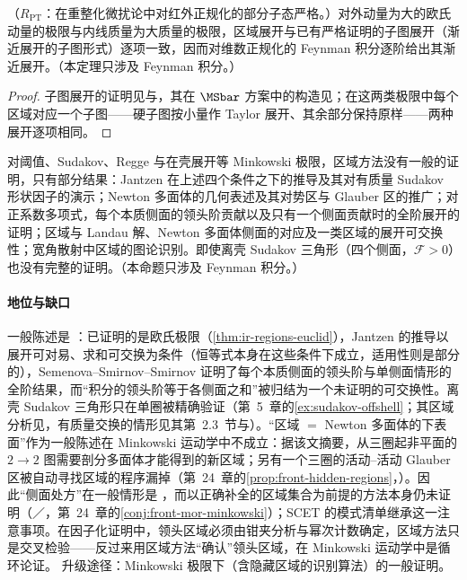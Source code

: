\begin{theorem}\label{thm:ir-regions-euclid}
（$R_{\mathrm{PT}}$：在重整化微扰论中对红外正规化的部分子态严格。）对外动量为大的欧氏动量的极限与内线质量为大质量的极限，区域展开与已有严格证明的子图展开（渐近展开的子图形式）逐项一致，因而对维数正规化的 Feynman 积分逐阶给出其渐近展开。（本定理只涉及 Feynman 积分。）
\end{theorem}
\begin{proof}
子图展开的证明见\cite{Smirnov:1990rz}与\cite{Smirnov2002}，其在 $\MSbar$ 方案中的构造见\cite{Gorishnii1989}；在这两类极限中每个区域对应一个子图——硬子图按小量作 Taylor 展开、其余部分保持原样——两种展开逐项相同\cite{Smirnov2002}。
\end{proof}

\begin{proposition}\label{prop:ir-regions-minkowski}
对阈值、Sudakov、Regge 与在壳展开等 Minkowski 极限，区域方法没有一般的证明，只有部分结果：Jantzen 在上述四个条件之下的推导及其对有质量 Sudakov 形状因子的演示\cite{Jantzen2011}；Newton 多面体的几何表述\cite{Pak:2010pt}及其对势区与 Glauber 区的推广\cite{Jantzen:2012mw}；对正系数多项式，每个本质侧面的领头阶贡献以及只有一个侧面贡献时的全阶展开的证明\cite{Semenova:2018cwy}；区域与 Landau 解、Newton 多面体侧面的对应及一类区域的展开可交换性\cite{Gardi:2022khw}；宽角散射中区域的图论识别\cite{Ma:2023hrt}。即使离壳 Sudakov 三角形（四个侧面，$\mathcal F>0$）也没有完整的证明。（本命题只涉及 Feynman 积分。）
\end{proposition}

\paragraph{地位与缺口}
一般陈述是 \tagP：已证明的是欧氏极限（\cref{thm:ir-regions-euclid}），Jantzen 的推导以展开可对易、求和可交换为条件（恒等式本身在这些条件下成立，适用性则是部分的）\cite{Jantzen2011}，Semenova--Smirnov--Smirnov 证明了每个本质侧面的领头阶与单侧面情形的全阶结果\cite{Semenova:2018cwy}，而“积分的领头阶等于各侧面之和”被归结为一个未证明的可交换性。离壳 Sudakov 三角形只在单圈被精确验证（第~5~章的\cref{ex:sudakov-offshell}；其区域分析见\cite[第~2.2~节]{BecherBroggioFerroglia2015}，有质量交换的情形见其第~2.3~节与\cite[第~6~节]{Jantzen2011}）。“区域 $=$ Newton 多面体的下表面”作为一般陈述在 Minkowski 运动学中不成立：据该文摘要，从三圈起非平面的 $2\to2$ 图需要剖分多面体才能得到的新区域\cite{Gardi:2024axt}；另有一个三圈的活动--活动 Glauber 区被自动寻找区域的程序漏掉\cite{Becher:2024kmk}（第~24~章的\cref{prop:front-hidden-regions}，\tagV）。因此“侧面处方”在一般情形是 \tagV，而以正确补全的区域集合为前提的方法本身仍未证明（\tagP／\tagC，第~24~章的\cref{conj:front-mor-minkowski}）；SCET 的模式清单继承这一注意事项。在因子化证明中，领头区域必须由钳夹分析与幂次计数确定，区域方法只是交叉检验——反过来用区域方法“确认”领头区域，在 Minkowski 运动学中是循环论证。%
升级途径：Minkowski 极限下（含隐藏区域的识别算法）的一般证明。

